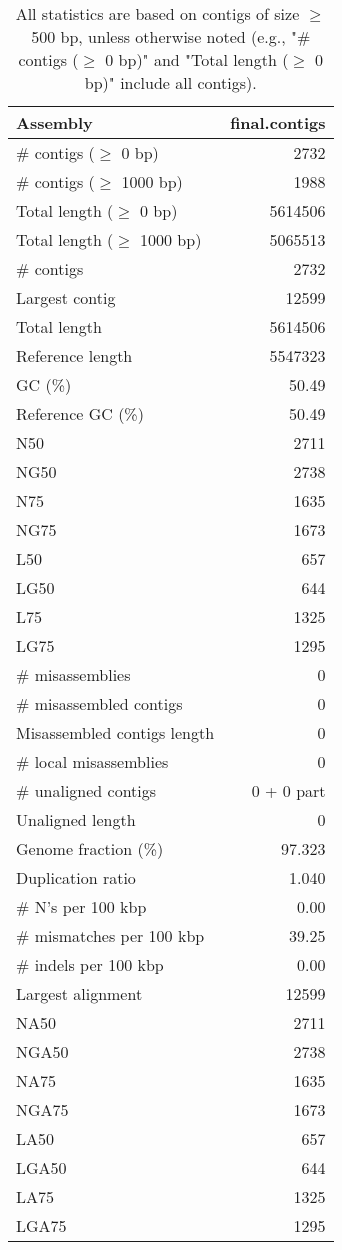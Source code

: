 \documentclass[12pt,a4paper]{article}
\begin{document}
\begin{table}[ht]
\begin{center}
\caption{All statistics are based on contigs of size $\geq$ 500 bp, unless otherwise noted (e.g., "\# contigs ($\geq$ 0 bp)" and "Total length ($\geq$ 0 bp)" include all contigs).}
\begin{tabular}{|l*{1}{|r}|}
\hline
Assembly & final.contigs \\ \hline
\# contigs ($\geq$ 0 bp) & 2732 \\ \hline
\# contigs ($\geq$ 1000 bp) & 1988 \\ \hline
Total length ($\geq$ 0 bp) & 5614506 \\ \hline
Total length ($\geq$ 1000 bp) & 5065513 \\ \hline
\# contigs & 2732 \\ \hline
Largest contig & 12599 \\ \hline
Total length & 5614506 \\ \hline
Reference length & 5547323 \\ \hline
GC (\%) & 50.49 \\ \hline
Reference GC (\%) & 50.49 \\ \hline
N50 & 2711 \\ \hline
NG50 & 2738 \\ \hline
N75 & 1635 \\ \hline
NG75 & 1673 \\ \hline
L50 & 657 \\ \hline
LG50 & 644 \\ \hline
L75 & 1325 \\ \hline
LG75 & 1295 \\ \hline
\# misassemblies & 0 \\ \hline
\# misassembled contigs & 0 \\ \hline
Misassembled contigs length & 0 \\ \hline
\# local misassemblies & 0 \\ \hline
\# unaligned contigs & 0 + 0 part \\ \hline
Unaligned length & 0 \\ \hline
Genome fraction (\%) & 97.323 \\ \hline
Duplication ratio & 1.040 \\ \hline
\# N's per 100 kbp & 0.00 \\ \hline
\# mismatches per 100 kbp & 39.25 \\ \hline
\# indels per 100 kbp & 0.00 \\ \hline
Largest alignment & 12599 \\ \hline
NA50 & 2711 \\ \hline
NGA50 & 2738 \\ \hline
NA75 & 1635 \\ \hline
NGA75 & 1673 \\ \hline
LA50 & 657 \\ \hline
LGA50 & 644 \\ \hline
LA75 & 1325 \\ \hline
LGA75 & 1295 \\ \hline
\end{tabular}
\end{center}
\end{table}
\end{document}
